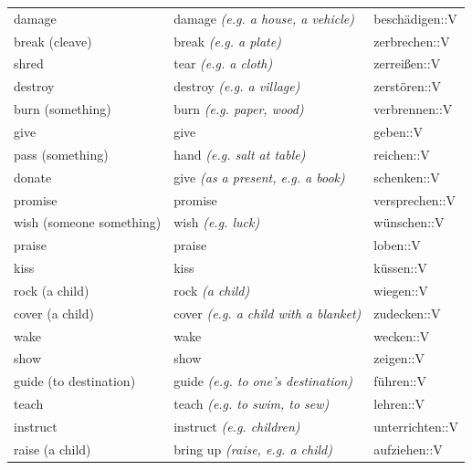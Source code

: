 \begin{center}
\begin{longtable}{lll}
{\sc \lowercase{	DAMAGE	}}	&	damage	\textit{\footnotesize (e.g. a house, a vehicle)}	&	beschädigen::V	\\
{\sc \lowercase{	BREAK \footnotesize (CLEAVE)	}}	&	break	\textit{\footnotesize (e.g. a plate)}	&	zerbrechen::V	\\
{\sc \lowercase{	SHRED	}}	&	tear	\textit{\footnotesize (e.g. a cloth)}	&	zerreißen::V	\\
{\sc \lowercase{	DESTROY	}}	&	destroy	\textit{\footnotesize (e.g. a village)}	&	zerstören::V	\\
{\sc \lowercase{	BURN \footnotesize (SOMETHING)	}}	&	burn	\textit{\footnotesize (e.g. paper, wood)}	&	verbrennen::V	\\
{\sc \lowercase{	GIVE	}}	&	give		&	geben::V	\\
{\sc \lowercase{	PASS \footnotesize (SOMETHING)	}}	&	hand	\textit{\footnotesize (e.g. salt at table)}	&	reichen::V	\\
{\sc \lowercase{	DONATE	}}	&	give	\textit{\footnotesize (as a present, e.g. a book)}	&	schenken::V	\\
{\sc \lowercase{	PROMISE	}}	&	promise		&	versprechen::V	\\
{\sc \lowercase{	\footnotesize WISH \footnotesize (SOMEONE SOMETHING)	}}	&	wish	\textit{\footnotesize (e.g. luck)}	&	wünschen::V	\\
{\sc \lowercase{	PRAISE	}}	&	praise		&	loben::V	\\
{\sc \lowercase{	KISS	}}	&	kiss		&	küssen::V	\\
{\sc \lowercase{	ROCK \footnotesize (A CHILD)	}}	&	rock	\textit{\footnotesize (a child)}	&	wiegen::V	\\
{\sc \lowercase{	COVER \footnotesize (A CHILD)	}}	&	cover	\textit{\footnotesize (e.g. a child with a blanket)}	&	zudecken::V	\\
{\sc \lowercase{	WAKE	}}	&	wake		&	wecken::V	\\
{\sc \lowercase{	SHOW	}}	&	show		&	zeigen::V	\\
{\sc \lowercase{	GUIDE \footnotesize (TO DESTINATION)	}}	&	guide	\textit{\footnotesize (e.g. to one's destination)}	&	führen::V	\\
{\sc \lowercase{	TEACH	}}	&	teach	\textit{\footnotesize (e.g. to swim, to sew)}	&	lehren::V	\\
{\sc \lowercase{	INSTRUCT	}}	&	instruct	\textit{\footnotesize (e.g. children)}	&	unterrichten::V	\\
{\sc \lowercase{	RAISE \footnotesize (A CHILD)	}}	&	bring up	\textit{\footnotesize (raise, e.g. a child)}	&	aufziehen::V	\\

\end{longtable}
\end{center}
